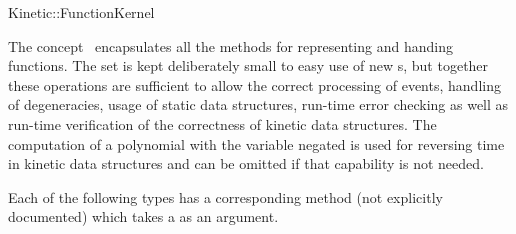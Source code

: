

\begin{ccRefConcept}{Kinetic::FunctionKernel}


\ccDefinition
  
The concept \ccRefName\ encapsulates all the methods for representing
and handing functions. The set is kept deliberately small to easy use
of new \ccRefName s, but together these operations are sufficient to
allow the correct processing of events, handling of degeneracies,
usage of static data structures, run-time error checking as well as
run-time verification of the correctness of kinetic data structures.
The computation of a polynomial with the variable negated is used for
reversing time in kinetic data structures and can be omitted if that
capability is not needed.


\ccTypes






Each of the following types has a corresponding  method (not explicitly documented) which takes a  as an argument.



\end{ccRefConcept}
